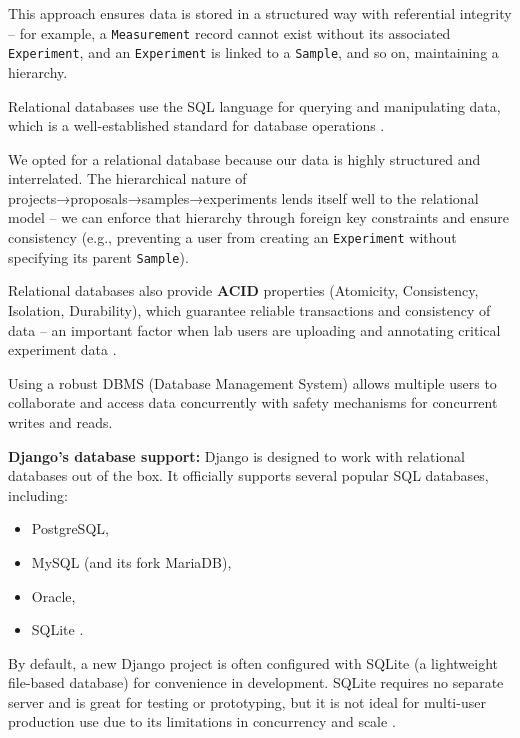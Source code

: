 This approach ensures data is stored in a structured way with referential 
integrity – for example, a \texttt{Measurement} record cannot exist without its 
associated \texttt{Experiment}, and an \texttt{Experiment} is linked to a 
\texttt{Sample}, and so on, maintaining a hierarchy. 

\medskip

Relational databases use the SQL language for querying and manipulating data, 
which is a well-established standard for database 
operations \parencite{ElmasriNavathe}. 

We opted for a relational database because our data is highly structured and 
interrelated. The hierarchical nature of projects→proposals→samples→experiments 
lends itself well to the relational model – we can enforce that hierarchy 
through foreign key constraints and ensure consistency (e.g., preventing a user 
from creating an \texttt{Experiment} without specifying its parent 
\texttt{Sample}). 

\medskip

Relational databases also provide \textbf{ACID} properties (Atomicity, 
Consistency, Isolation, Durability), which guarantee reliable transactions and 
consistency of data – an important factor when lab users are uploading and 
annotating critical experiment data \parencite{PostgresAbout}. 

Using a robust DBMS (Database Management System) allows multiple users to 
collaborate and access data concurrently with safety mechanisms for concurrent 
writes and reads. 

\medskip

\noindent
\textbf{Django’s database support:} Django is designed to work with relational 
databases out of the box. It officially supports several popular SQL databases, 
including:
\begin{itemize}
	\item PostgreSQL, 
	\item MySQL (and its fork MariaDB), 
	\item Oracle, 
	\item SQLite \parencite{DjangoDatabases}.
\end{itemize}

By default, a new Django project is often configured with SQLite (a lightweight 
file-based database) for convenience in development. SQLite requires no 
separate server and is great for testing or prototyping, but it is not ideal 
for multi-user production use due to its limitations in concurrency and 
scale \parencite{SQLiteAppropriateUses}. 

